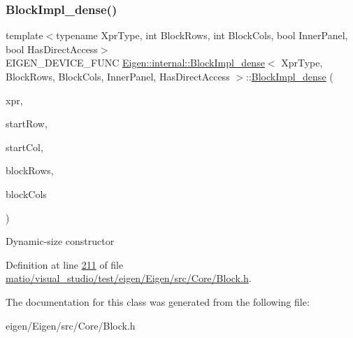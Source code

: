 \subsubsection{\texorpdfstring{Block\+Impl\+\_\+dense()}{BlockImpl\_dense()}\hspace{0.1cm}{\footnotesize\ttfamily [6/6]}}
{\footnotesize\ttfamily template$<$typename Xpr\+Type, int Block\+Rows, int Block\+Cols, bool Inner\+Panel, bool Has\+Direct\+Access$>$ \\
E\+I\+G\+E\+N\+\_\+\+D\+E\+V\+I\+C\+E\+\_\+\+F\+U\+NC \hyperlink{class_eigen_1_1internal_1_1_block_impl__dense}{Eigen\+::internal\+::\+Block\+Impl\+\_\+dense}$<$ Xpr\+Type, Block\+Rows, Block\+Cols, Inner\+Panel, Has\+Direct\+Access $>$\+::\hyperlink{class_eigen_1_1internal_1_1_block_impl__dense}{Block\+Impl\+\_\+dense} (\begin{DoxyParamCaption}\item[{Xpr\+Type \&}]{xpr,  }\item[{\hyperlink{namespace_eigen_a62e77e0933482dafde8fe197d9a2cfde}{Index}}]{start\+Row,  }\item[{\hyperlink{namespace_eigen_a62e77e0933482dafde8fe197d9a2cfde}{Index}}]{start\+Col,  }\item[{\hyperlink{namespace_eigen_a62e77e0933482dafde8fe197d9a2cfde}{Index}}]{block\+Rows,  }\item[{\hyperlink{namespace_eigen_a62e77e0933482dafde8fe197d9a2cfde}{Index}}]{block\+Cols }\end{DoxyParamCaption})\hspace{0.3cm}{\ttfamily [inline]}}

Dynamic-\/size constructor 

Definition at line \hyperlink{matio_2visual__studio_2test_2eigen_2_eigen_2src_2_core_2_block_8h_source_l00211}{211} of file \hyperlink{matio_2visual__studio_2test_2eigen_2_eigen_2src_2_core_2_block_8h_source}{matio/visual\+\_\+studio/test/eigen/\+Eigen/src/\+Core/\+Block.\+h}.



The documentation for this class was generated from the following file\+:\begin{DoxyCompactItemize}
\item 
eigen/\+Eigen/src/\+Core/\+Block.\+h\end{DoxyCompactItemize}
